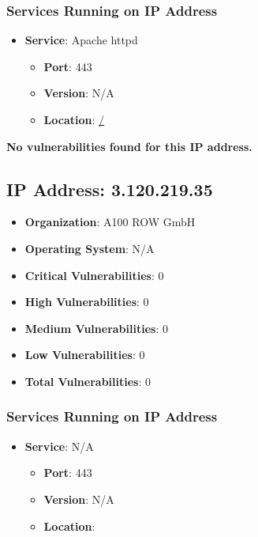 \documentclass{article}
\begin{document}
\subsubsection*{Services Running on IP Address}

\begin{itemize}
    
        \item \textbf{Service}: Apache httpd
        \begin{itemize}
            \item \textbf{Port}: 443
            \item \textbf{Version}:  N/A 
            \item \textbf{Location}: \href{ / }{ / }
        \end{itemize}
    
\end{itemize}


\textbf{No vulnerabilities found for this IP address.}




\clearpage



\subsection*{IP Address: 3.120.219.35}

\begin{itemize}
    \item \textbf{Organization}: A100 ROW GmbH
    \item \textbf{Operating System}:  N/A 
    \item \textbf{Critical Vulnerabilities}: 0
    \item \textbf{High Vulnerabilities}: 0
    \item \textbf{Medium Vulnerabilities}: 0
    \item \textbf{Low Vulnerabilities}: 0
    \item \textbf{Total Vulnerabilities}: 0
\end{itemize}

\subsubsection*{Services Running on IP Address}

\begin{itemize}
    
        \item \textbf{Service}: N/A
        \begin{itemize}
            \item \textbf{Port}: 443
            \item \textbf{Version}:  N/A 
            \item \textbf{Location}: \href{  }{  }
        \end{itemize}
    
\end{itemize}
\end{document}
